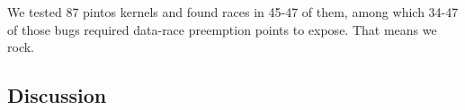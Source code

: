 
We tested 87 pintos kernels and found races in 45-47 of them, among which 34-47 of those bugs required data-race preemption points to expose. That means we rock.


\subsection{Discussion} %

